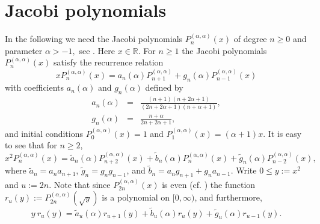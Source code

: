 \documentclass[12pt]{amsart}
\newcommand{\R}{\mathbb{R}}
\begin{document}
 
\section{Jacobi polynomials}

In the following we need the Jacobi polynomials $P_{n}^{\left( \alpha
,\alpha \right) }\left( x\right) $ of degree $n\ge 0$ and parameter  \color{red} $\alpha > -1,$ \color{black}
see \cite[2.4.1, p. 29]{Szeg39}. Here $x\in\R$. For $n \ge 1$ the Jacobi polynomials $P_{n}^{\left( \alpha ,\alpha
\right) }\left( x\right) $ satisfy the recurrence relation 
\begin{equation*}
xP_{n}^{\left( \alpha ,\alpha \right) }\left( x\right) =a_{n}\left( \alpha
\right) P_{n+1}^{\left( \alpha ,\alpha \right) }+g_{n}\left( \alpha \right)
P_{n-1}^{\left( \alpha ,\alpha \right) }\left( x\right)
\end{equation*}
with coefficients $a_{n}\left( \alpha \right) $ and $g_{n}\left( \alpha
\right) $ defined by 
\begin{eqnarray*}
a_{n}\left( \alpha \right) &=&\frac{\left( n+1\right) \left( n+2\alpha
+1\right) }{\left( 2n+2\alpha +1\right) \left( n+\alpha +1\right) }, \\
g_{n}\left( \alpha \right) &=&\frac{n+\alpha }{2n+2\alpha +1},
\end{eqnarray*}
and initial conditions $P_{0}^{\left( \alpha ,\alpha \right) }\left(
x\right) =1$ and $P_{1}^{\left( \alpha ,\alpha \right) }\left( x\right)
=\left( \alpha +1\right) x.$ It is easy to see that for $n \ge 2$,
\begin{equation}
x^{2}P_{n}^{\left( \alpha ,\alpha \right) }\left( x\right) =\widetilde{a}%
_{n}\left( \alpha \right) P_{n+2}^{\left( \alpha ,\alpha \right) }\left(
x\right) +\widetilde{b}_{n}\left( \alpha \right) P_{n}^{\left( \alpha
,\alpha \right) }\left( x\right) +\widetilde{g}_{n}\left( \alpha \right)
P_{n-2}^{\left( \alpha ,\alpha \right) }\left( x\right),  \label{eqrec2}
\end{equation}%
where $\widetilde{a}_{n}=a_{n}a_{n+1}$, $\widetilde{g}_{n}=g_{n}g_{n-1}$,
and $\widetilde{b}_{n}=a_{n}g_{n+1}+g_{n}a_{n-1}.$
Write $0 \le y := x^2$ and $u := 2n$. Note that since 
$P_{2 n}^{\left( \alpha ,\alpha \right) }\left( x\right)$ is even (cf. \cite[(4.1.3)]{Szeg39}) the function 
$r_u(y) := P_{2 n}^{\left( \alpha ,\alpha \right) }\left( \sqrt{y}\right)$ is a polynomial on $[0, \infty)$, and furthermore,
\begin{equation}
 y \ r_{u} \left( y \right) =
 \widetilde{a}_{u}\left( \alpha \right) r_{u+1} \left(
	y \right) +\widetilde{b}_{u}\left( \alpha \right)  
r_{u} \left( y  \right)  +\widetilde{g}_{u}\left( \alpha \right)
 r_{u - 1} \left(
	 y  \right).  \label{eqrec3}
\end{equation}
\end{document}

